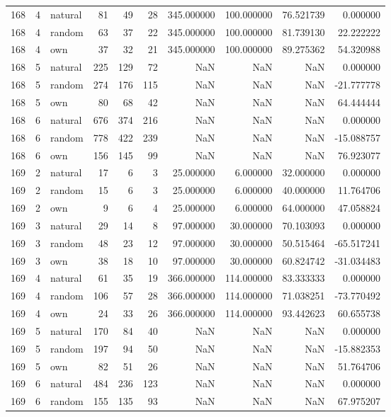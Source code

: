 \begin{table}[htbp]
\begin{tabular}{rrlrrrrrrr}
168 & 4 & natural & 81 & 49 & 28 & 345.000000 & 100.000000 & 76.521739 & 0.000000 \\
168 & 4 & random & 63 & 37 & 22 & 345.000000 & 100.000000 & 81.739130 & 22.222222 \\
168 & 4 & own & 37 & 32 & 21 & 345.000000 & 100.000000 & 89.275362 & 54.320988 \\
168 & 5 & natural & 225 & 129 & 72 & NaN & NaN & NaN & 0.000000 \\
168 & 5 & random & 274 & 176 & 115 & NaN & NaN & NaN & -21.777778 \\
168 & 5 & own & 80 & 68 & 42 & NaN & NaN & NaN & 64.444444 \\
168 & 6 & natural & 676 & 374 & 216 & NaN & NaN & NaN & 0.000000 \\
168 & 6 & random & 778 & 422 & 239 & NaN & NaN & NaN & -15.088757 \\
168 & 6 & own & 156 & 145 & 99 & NaN & NaN & NaN & 76.923077 \\
169 & 2 & natural & 17 & 6 & 3 & 25.000000 & 6.000000 & 32.000000 & 0.000000 \\
169 & 2 & random & 15 & 6 & 3 & 25.000000 & 6.000000 & 40.000000 & 11.764706 \\
169 & 2 & own & 9 & 6 & 4 & 25.000000 & 6.000000 & 64.000000 & 47.058824 \\
169 & 3 & natural & 29 & 14 & 8 & 97.000000 & 30.000000 & 70.103093 & 0.000000 \\
169 & 3 & random & 48 & 23 & 12 & 97.000000 & 30.000000 & 50.515464 & -65.517241 \\
169 & 3 & own & 38 & 18 & 10 & 97.000000 & 30.000000 & 60.824742 & -31.034483 \\
169 & 4 & natural & 61 & 35 & 19 & 366.000000 & 114.000000 & 83.333333 & 0.000000 \\
169 & 4 & random & 106 & 57 & 28 & 366.000000 & 114.000000 & 71.038251 & -73.770492 \\
169 & 4 & own & 24 & 33 & 26 & 366.000000 & 114.000000 & 93.442623 & 60.655738 \\
169 & 5 & natural & 170 & 84 & 40 & NaN & NaN & NaN & 0.000000 \\
169 & 5 & random & 197 & 94 & 50 & NaN & NaN & NaN & -15.882353 \\
169 & 5 & own & 82 & 51 & 26 & NaN & NaN & NaN & 51.764706 \\
169 & 6 & natural & 484 & 236 & 123 & NaN & NaN & NaN & 0.000000 \\
169 & 6 & random & 155 & 135 & 93 & NaN & NaN & NaN & 67.975207 \\

\end{tabular}
\end{table}

